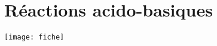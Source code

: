 \documentclass[../main/main.tex]{subfiles}
\begin{document}
\setcounter{chapter}{3}

\chapter{R\'eactions acido-basiques}

\begin{center}
    \texttt{[image: fiche]}
\end{center}
\end{document}
